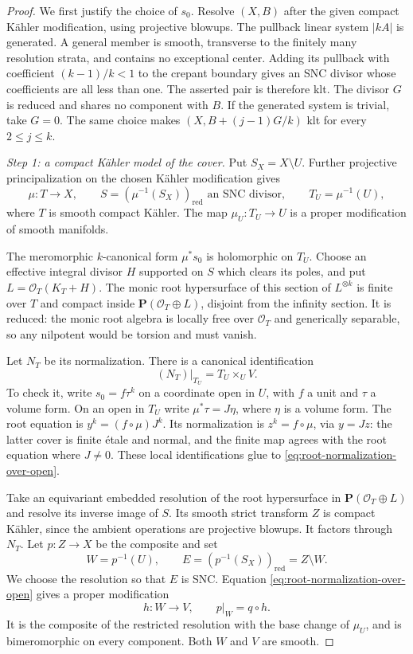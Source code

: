 \documentclass[11pt,a4paper]{article}
\numberwithin{equation}{section}
\theoremstyle{definition}
\theoremstyle{remark}
\newcommand{\PP}{\mathbf P}\newcommand{\HH}{\mathbb H}
\newcommand{\OO}{\mathcal O}\newcommand{\cX}{\mathcal X}
\begin{document}
\begin{proof}
We first justify the choice of $s_0$. Resolve $(X,B)$ after the given
compact Kähler modification, using projective blowups. The pullback
linear system $|kA|$ is generated. A general member is smooth, transverse
to the finitely many resolution strata, and contains no exceptional
center. Adding its pullback with coefficient $(k-1)/k<1$ to the crepant
boundary gives an SNC divisor whose coefficients are all less than one.
The asserted pair is therefore klt. The divisor $G$ is reduced and
shares no component with $B$. If the generated system is trivial, take
$G=0$. The same choice makes $(X,B+(j-1)G/k)$ klt for every $2\le j\le k$.

\emph{Step 1: a compact Kähler model of the cover.}
Put $S_X=X\setminus U$. Further projective principalization on the
chosen Kähler modification gives
\[
 \mu:T\longrightarrow X,\qquad
 S=(\mu^{-1}(S_X))_{\mathrm{red}}\text{ an SNC divisor},\qquad
 T_U=\mu^{-1}(U),
\]
where $T$ is smooth compact Kähler. The map $\mu_U:T_U\to U$ is a proper
modification of smooth manifolds.

The meromorphic $k$-canonical form $\mu^*s_0$ is holomorphic on $T_U$.
Choose an effective integral divisor $H$ supported on $S$ which clears
its poles, and put $L=\OO_T(K_T+H)$. The monic root hypersurface
of this section of $L^{\otimes k}$ is finite over $T$ and compact inside
$\PP(\OO_T\oplus L)$, disjoint from the infinity section. It is reduced:
the monic root algebra is locally free over $\OO_T$ and generically
separable, so any nilpotent would be torsion and must vanish.

Let $N_T$ be its normalization. There is a canonical identification
\begin{equation}\label{eq:root-normalization-over-open}
 (N_T)|_{T_U}=T_U\times_U V.
\end{equation}
To check it, write $s_0=f\tau^k$ on a coordinate open in $U$, with
$f$ a unit and $\tau$ a volume form. On an open in $T_U$ write
$\mu^*\tau=J\eta$, where $\eta$ is a volume form. The root equation is
$y^k=(f\circ\mu)J^k$. Its normalization is
$z^k=f\circ\mu$, via $y=Jz$: the latter cover is finite étale and
normal, and the finite map agrees with the root equation where $J\ne0$.
These local identifications glue to
\eqref{eq:root-normalization-over-open}.

Take an equivariant embedded resolution of the root hypersurface in
$\PP(\OO_T\oplus L)$ and resolve its inverse image of $S$. Its smooth
strict transform $Z$ is compact Kähler, since the ambient operations are
projective blowups. It factors through $N_T$. Let $p:Z\to X$ be the
composite and set
\[
 W=p^{-1}(U),\qquad E=(p^{-1}(S_X))_{\mathrm{red}}=Z\setminus W.
\]
We choose the resolution so that $E$ is SNC. Equation
\eqref{eq:root-normalization-over-open} gives a proper modification
\begin{equation}\label{eq:open-cover-modification}
 h:W\longrightarrow V,\qquad p|_W=q\circ h.
\end{equation}
It is the composite of the restricted resolution with the base change
of $\mu_U$, and is bimeromorphic on every component. Both $W$ and $V$
are smooth.


\end{proof}
\end{document}
